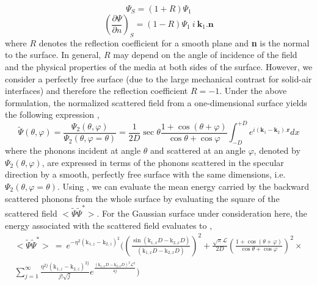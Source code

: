 \begin{equation}\label{eq:ch2-4}
\Psi_{S}=(1+R)\Psi_1
\end{equation}
\begin{equation}\label{eq:ch2-5}
\left(\frac{\partial\Psi}{\partial n}\right)_{S}=\left(1-R\right)\Psi_1{\ i\ \mathbf{k}}_1.\mathbf{n}
\end{equation}
where $R$ denotes the reflection coefficient for a smooth plane and \textbf{n} is the normal to the surface. In general, $R$ may depend on the angle of incidence of the field and the physical properties of the media at both sides of the surface. However, we consider a perfectly free surface (due to the large mechanical contrast for solid-air interfaces) and therefore the reflection coefficient $R=-1$. Under the above formulation, the normalized scattered field from a one-dimensional surface yields the following expression \cite{book_Beckmann},
\begin{equation}\label{eq:ch2-6}
\widetilde{\Psi}(\theta,\varphi)=\frac{\Psi_2(\theta,\varphi)}{\Psi_2(\theta,\varphi=\theta)}=\frac{1}{2D}\sec{\theta}\frac{1+\cos{(\theta+\varphi)}}{\cos{\theta}+\cos{\varphi}}\int_{-D}^{+D}e^{i\left(\mathbf{k}_1-\mathbf{k}_2\right).\mathbf{r}}dx
\end{equation}
 where the phonons incident at angle $\theta$ and scattered at an angle $\varphi$, denoted by $\Psi_2(\theta,\varphi)$, are expressed in terms of the phonons scattered in the specular direction by a smooth, perfectly free surface with the same dimensions, i.e. $\Psi_2(\theta,\varphi=\theta)$. Using , we can evaluate the mean energy carried by the backward scattered phonons from the whole surface by evaluating the square of the scattered field $<\widetilde{\Psi}{\widetilde{\Psi}}^\ast>$. For the Gaussian surface under consideration here, the energy associated with the scattered field evaluates to \cite{ownNW},
\begin{equation}\label{eq:ch2-7}
\begin{split}
<\widetilde{\Psi}{\widetilde{\Psi}}^\ast>\ =\ e^{-\eta^2\left(\mathrm{k}_{1,z}-\mathrm{k}_{2,z}\right)^2}
\Bigg(\left(\frac{\sin{\left(\mathrm{k}_{1,x}D-\mathrm{k}_{2,x} D\right)}}{\left(\mathrm{k}_{1,x}D-\mathrm{k}_{2,x} D\right)}\right)^2 + \frac{\sqrt\pi\mathcal{L}}{2D}\left(\frac{1+\cos{\left(\theta+\varphi\right)}}{\cos{\theta}+\cos{\varphi}}\right)^2 \times \\ \sum_{j=1}^{\infty}\frac{\eta^{2j}\left(\mathrm{k}_{1,z}-\mathrm{k}_{2,z}\right)^{2j}}{j!\sqrt j}e^\frac{\left(\mathrm{k}_{1,x}D-\mathrm{k}_{2,x} D\right)^2\mathcal{L}^2}{4j} \Bigg)
\end{split}
\end{equation} 
